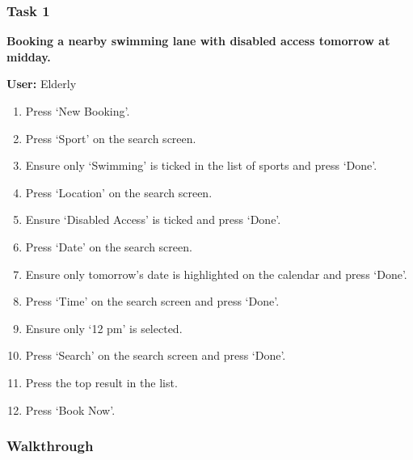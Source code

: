 \subsubsection{Task 1}
\label{ssub:task_1}

\textbf{Booking a nearby swimming lane with disabled access tomorrow at
midday.}

\textbf{User:} Elderly
\begin{enumerate}
	\item Press `New Booking'.
	\item Press `Sport' on the search screen.
	\item Ensure only `Swimming' is ticked in the list of sports and press
		`Done'.
	\item Press `Location' on the search screen.
	\item Ensure `Disabled Access' is ticked and press `Done'.
	\item Press `Date' on the search screen.
	\item Ensure only tomorrow's date is highlighted on the calendar and press
		`Done'.
	\item Press `Time' on the search screen and press `Done'.
	\item Ensure only `12 pm' is selected.
	\item Press `Search' on the search screen and press `Done'.
	\item Press the top result in the list.
	\item Press `Book Now'.
\end{enumerate}

\subsubsection{Walkthrough}

